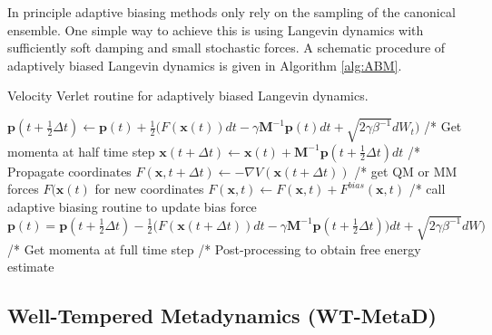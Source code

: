 In principle adaptive biasing methods only rely on the sampling of the canonical ensemble. One simple way to achieve this is using Langevin dynamics with sufficiently soft damping and small stochastic forces. A schematic procedure of adaptively biased Langevin dynamics is given in Algorithm \ref{alg:ABM}.
\begin{algorithm}[H]
  \caption{Velocity Verlet routine for adaptively biased Langevin dynamics.}
  \label{alg:ABM}
    \begin{algorithmic}
        \STATE
            \STATE $\textbf{p}(t+\frac{1}{2}\Delta t) \leftarrow \textbf{p}(t) + \frac{1}{2} \bigl(F(\textbf{x}(t))dt-\gamma \textbf{M}^{-1}\textbf{p}(t) dt + \sqrt{2\gamma\beta^{-1}}dW_t \bigr)$
        \STATE /* Get momenta at half time step
        \STATE
            \STATE $\textbf{x}(t+\Delta t) \leftarrow \textbf{x}(t) + \textbf{M}^{-1} \textbf{p}(t+\frac{1}{2}\Delta t) dt$
        \STATE /* Propagate coordinates
        \STATE
        \STATE $F(\textbf{x},t+\Delta t) \leftarrow - \nabla V(\textbf{x}(t+\Delta t))$
        \STATE /* get QM or MM forces $F(\textbf{x}(t)$ for new coordinates
        \STATE
        \STATE $F(\textbf{x},t) \leftarrow F(\textbf{x},t) + F^{bias}(\textbf{x},t)$
        \STATE /* call adaptive biasing routine to update bias force
        \STATE
            \STATE $\textbf{p}(t) = \textbf{p}(t+\frac{1}{2}\Delta t) - \frac{1}{2} \bigl(F(\textbf{x}(t+\Delta t))dt-\gamma \textbf{M}^{-1}\textbf{p}(t+\frac{1}{2}\Delta t)) dt + \sqrt{2\gamma\beta^{-1}}dW\bigr)$
        \STATE /* Get momenta at full time step
        \STATE
      \ENDWHILE
      \STATE /* Post-processing to obtain free energy estimate
    \end{algorithmic}
\end{algorithm}

\subsection{Well-Tempered Metadynamics (WT-MetaD)}
\label{sec:metaD}

